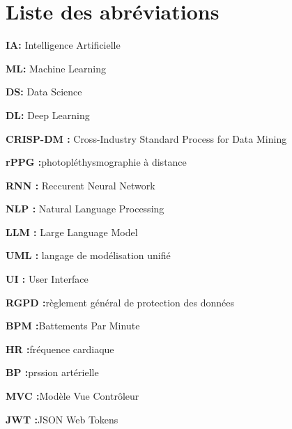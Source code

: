 \chapter*{Liste des abréviations}


\textbf{IA:} Intelligence Artificielle

\textbf{ML:} Machine Learning

\textbf{DS:} Data Science

\textbf{DL:} Deep Learning

\textbf{CRISP-DM :} Cross-Industry Standard Process for Data Mining

\textbf{rPPG :}photopléthysmographie à distance

\textbf{RNN :} Reccurent Neural Network 

\textbf{NLP :} Natural Language Processing

\textbf{LLM :} Large Language Model

\textbf{UML :} langage de modélisation unifié

\textbf{UI :} User Interface

\textbf{RGPD :}règlement général de protection des données

\textbf{BPM :}Battements Par Minute

\textbf{HR :}fréquence cardiaque

\textbf{BP :}prssion artérielle 

\textbf{MVC :}Modèle Vue Contrôleur

\textbf{JWT :}JSON Web Tokens